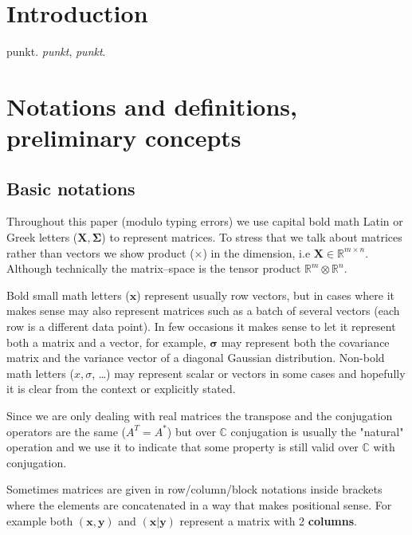 \documentclass[11pt, a4paper]{report}
\theoremstyle{plain}
\theoremstyle{definition}
\theoremstyle{remark}
\newcommand{\C}{\mathbb{C}}
\newcommand{\R}{\mathbb{R}}
\newcommand{\x}{\mathbf{x}}
\newcommand{\y}{\mathbf{y}}
\newcommand{\bv}[1]{\boldsymbol{#1}}
\begin{document}
\listoftables

\listoffigures

\tableofcontents

\chapter{Introduction} punkt. \emph{punkt}, \textit{punkt}.

\chapter{Notations and definitions, preliminary concepts}

\section{Basic notations} Throughout this paper (modulo typing errors) we use
capital bold math Latin or Greek letters ($\bv{X, \Sigma}$) to represent
matrices. To stress that we talk about matrices rather than vectors we show
product ($\times$) in the dimension, i.e $\bv{X} \in \R^{m \times n}$. Although
technically the matrix--space is the tensor product $\R^m \otimes \R^n$.

Bold small math letters ($\bv{x}$) represent usually row vectors, but in cases
where it makes sense may also represent matrices such as a batch of several
vectors (each row is a different data point). In few occasions it makes sense to
let it represent both a matrix and a vector, for example, $\bv{\sigma}$ may
represent both the covariance matrix and the variance vector of a diagonal
Gaussian distribution. Non-bold math letters ($x, \sigma$, \dots) may represent
scalar or vectors in some cases and hopefully it is clear from the context or
explicitly stated.

Since we are only dealing with real matrices the transpose and the conjugation
operators are the same ($A^T = A^*$) but over $\C$ conjugation is
usually the "natural" operation and we use it to indicate that some property is
still valid over $\C$ with conjugation.

Sometimes matrices are given in row/column/block notations inside brackets where
the elements are concatenated in a way that makes positional sense.
For example
both $(\x,\y)$ and $(\x | \y)$ represent a matrix with 2 \textbf{columns}.
\end{document}
